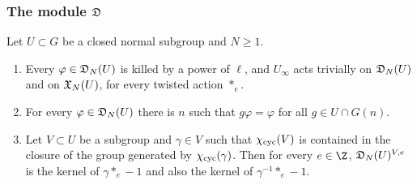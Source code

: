 \subsubsection{The module $\mathfrak D$}

\begin{lemma}\label{pf:vwin-he:dinf-basic}
Let $U\subset G$ be a closed normal subgroup and $N\ge1$.
\begin{enumerate}[label=(\alph*)]
\item\label{pf:vwin-he:dinf-tors} Every $\varphi\in\mathfrak D_N(U)$ is killed by a power of $\ell$, and $U_\infty$ acts
trivially on $\mathfrak D_N(U)$ and on $\mathfrak X_N(U)$, for every twisted action $\ast_e$.
\item\label{pf:vwin-he:dinf-nil} For every $\varphi\in\mathfrak D_N(U)$ there is $n$ such that $g\varphi=\varphi$ for all
$g\in U\cap G(n)$.
\item\label{pf:vwin-he:dinf-gen} Let $V\subset U$ be a subgroup and $\gamma\in V$ such that $\chi_{\mathrm{cyc}}(V)$ is contained
in the closure of the group generated by $\chi_{\mathrm{cyc}}(\gamma)$. Then for every $e\in\Z$,
$\mathfrak D_N(U)^{V,e}$ is the kernel of $\gamma\ast_e-1$ and also the kernel of $\gamma^{-1}\ast_e-1$.
\end{enumerate}
\end{lemma}


